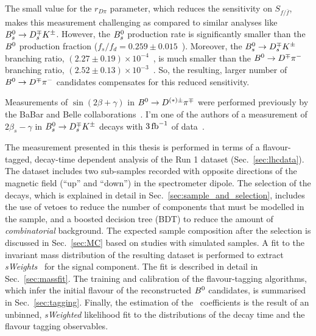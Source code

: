 The small value for the $r_{D\pi}$ parameter, which reduces the sensitivity on $S_{f/\bar f}$, makes this measurement challenging 
as compared to similar analyses like $B^0_s\rightarrow D^{\mp}_sK^\pm$. 
However, the $B^0_s$ production rate is significantly smaller 
than the $B^0$ production fraction ($f_s/f_d=0.259\pm0.015$~\cite{LHCb:2013lka}). 
Moreover, the $B^0_s\rightarrow D^{\mp}_sK^\pm$ branching ratio, $(2.27\pm0.19)\times 10^{-4}$~\cite{Louvot:2008sc}, is much smaller than 
the $B^0\rightarrow D^\mp\pi^-$ branching ratio, $(2.52\pm0.13)\times 10^{-3}$~\cite{PDG2017}.  
So, the resulting, larger number of $B^0\rightarrow D^\mp\pi^-$ candidates compensates for this reduced sensitivity.

Measurements of $\sin(2\beta+\gamma)$ in $B^0\rightarrow D^{(*)\pm}\pi^\mp$ were performed previously
by the BaBar and Belle collaborations~\cite{Aubert:2006tw,Aubert:2005yf,Bahinipati:2011yq,PhysRevD.73.092003}.
I'm one of the authors of a measurement of $2\beta_s - \gamma$ in $B^0_s\rightarrow D^{\mp}_sK^\pm$ decays with $3\mbox{\,fb}^{-1}$ of data~\cite{LHCb-PAPER-2017-047}.

The measurement presented in this thesis is performed in terms of a flavour-tagged, decay-time dependent
analysis of the Run 1 dataset (Sec.~\ref{sec:lhcdata}). The dataset includes two sub-samples recorded with opposite
directions of the magnetic field (``up'' and ``down'') in the spectrometer dipole.
The selection of the decays, which is explained in detail in Sec.~\ref{sec:sample_and_selection}, includes
the use of vetoes to reduce the number of components that must be modelled in the sample, and
a boosted decision tree (BDT) to reduce the amount of \emph{combinatorial} background. The expected sample
composition after the selection is discussed in Sec.~\ref{sec:MC} based on
studies with simulated samples. A fit to the invariant mass distribution of the
resulting dataset is performed to extract \emph{sWeights}~\cite{Pivk:2004ty} for the signal component. The
fit is described in detail in Sec.~\ref{sec:massfit}. The training and
calibration of the flavour-tagging algorithms, which infer the initial flavour
of the reconstructed $B^0$ candidates, is summarised in
Sec.~\ref{sec:tagging}. Finally, the estimation of the \CP~coefficients is
the result of an unbinned, \emph{sWeighted} likelihood fit to the distributions of the
decay time and the flavour tagging observables. 
